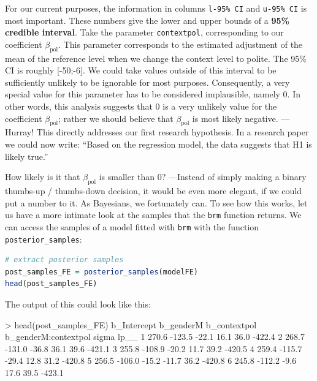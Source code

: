\documentclass[nobib]{tufte-handout}
\begin{document}
For our current purposes, the information in  columns \texttt{l-95\% CI} and \texttt{u-95\% CI} is most important.
These numbers give the lower and upper bounds of a \textbf{95\% credible interval}.
Take the parameter \texttt{contextpol}, corresponding to our coefficient $\beta_{\text{pol}}$.
This parameter corresponds to the estimated adjustment of the mean of the reference level when we change the context level to polite.
The 95\% CI is roughly [-50;-6].
We could take values outside of this interval to be sufficiently unlikely to be ignorable for most purposes.
Consequently, a very special value for this parameter has to be considered implausible, namely 0.
In other words, this analysis suggests that 0 is a very unlikely value for the coefficient $\beta_{\text{pol}}$; rather we should believe that $\beta_{\text{pol}}$ is most likely negative. --- Hurray!
This directly addresses our first research hypothesis.
In a research paper we could now write: ``Based on the regression model, the data suggests that H1 is likely true.''

How likely is it that $\beta_{\text{pol}}$ is smaller than 0? ---Instead of simply making a binary thumbs-up / thumbs-down decision, it would be even more elegant, if we could put a number to it. As Bayesians, we fortunately can. To see how this works, let us have a more intimate look at the samples that the \texttt{brm} function returns. We can access the samples of a model fitted with \texttt{brm} with the function \texttt{posterior\_samples}:

\bigskip

\begin{minipage}[]{\textwidth}
\begin{lstlisting}[language=R]
# extract posterior samples 
post_samples_FE = posterior_samples(modelFE)
head(post_samples_FE)
\end{lstlisting}
\end{minipage}

The output of this could look like this:

\bigskip

\begin{minipage}[]{1.2\textwidth}
\begin{rc}
> head(post_samples_FE)
  b_Intercept b_genderM b_contextpol b_genderM:contextpol sigma   lp__
1       270.6    -123.5        -22.1                 16.1  36.0 -422.4
2       268.7    -131.0        -36.8                 36.1  39.6 -421.1
3       255.8    -108.9        -20.2                 11.7  39.2 -420.5
4       259.4    -115.7        -29.4                 12.8  31.2 -420.8
5       256.5    -106.0        -15.2                -11.7  36.2 -420.8
6       245.8    -112.2         -9.6                 17.6  39.5 -423.1
\end{rc}
\end{minipage}
\end{document}
